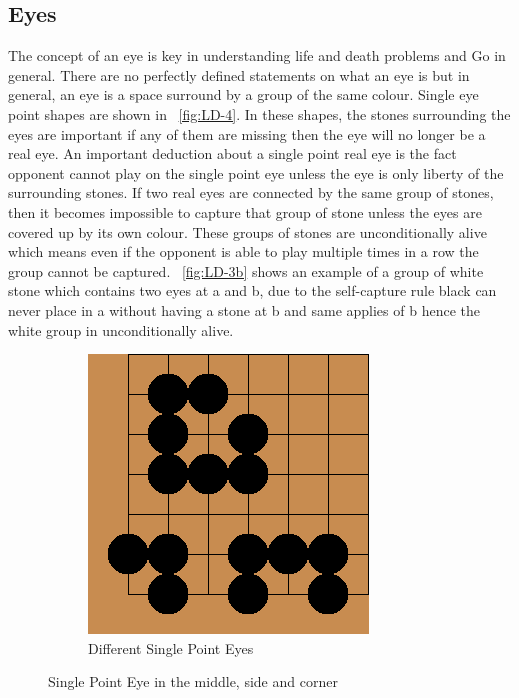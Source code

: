 \documentclass{l4proj}
\begin{document}
\subsection{Eyes}
The concept of an eye is key in understanding life and death problems and Go in general. There are no perfectly defined statements on what an eye is but in general, an eye is a space surround by a group of the same colour. Single eye point shapes are shown in ~\autoref{fig:LD-4}. In these shapes, the stones surrounding the eyes are important if any of them are missing then the eye will no longer be a real eye. An important deduction about a single point real eye is the fact opponent cannot play on the single point eye unless the eye is only liberty of the surrounding stones. If two real eyes are connected by the same group of stones, then it becomes impossible to capture that group of stone unless the eyes are covered up by its own colour. These groups of stones are unconditionally alive which means even if the opponent is able to play multiple times in a row the group cannot be captured. ~\autoref{fig:LD-3b} shows an example of a group of white stone which contains two eyes at a and b, due to the self-capture rule black can never place in a without having a stone at b and same applies of b hence the white group in unconditionally alive.

\begin{figure}[!ht]
\centering
\begin{subfigure}[b]{0.3\textwidth}
\includegraphics[width=\textwidth]{LD/4.png}
\caption{Different Single Point Eyes}
\label{fig:LD-4a}
\end{subfigure}
\caption{Single Point Eye in the middle, side and corner}
\label{fig:LD-4}
\end{figure}
\end{document}
